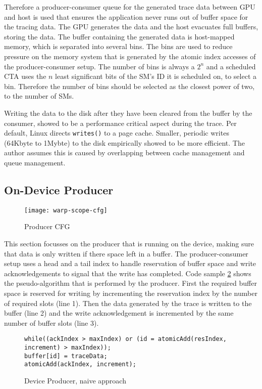	Therefore a producer-consumer queue for the generated trace data between GPU and host is used that ensures the application never runs out of buffer space for the tracing data. The GPU generates the data and the host evacuates full buffers, storing the data.
	The buffer containing the generated data is host-mapped memory, which is separated into several bins. The bins are used to reduce
	pressure on the memory system that is generated by the atomic index accesses of the producer-consumer setup. The number of bins 
	is always a $2^n$ and a scheduled CTA uses the  $n$ least significant bits of the SM's ID it is scheduled on, to select a bin. Therefore the number of bins should be selected as the closest power of two, to the number of SMs.

	Writing the data to the disk after they have been cleared from the buffer by the consumer, showed to be a performance critical aspect during the trace. Per default, Linux directs \verb|writes()| to a page cache. Smaller, periodic writes (64Kbyte to 1Mybte) to the disk empirically showed to be more efficient. The author assumes this is caused by overlapping between cache management and queue management.
	
	\subsection{On-Device Producer}
\begin{figure}[t]
	\centering
	\texttt{[image: warp-scope-cfg]}
	\caption{Producer CFG}
\label{wscfg}
\end{figure}	
	This section focusses on the producer that is running on the device, making sure that data is only written if there space left
	in a buffer. The producer-consumer setup uses a head and a tail index to handle reservation of buffer space and write acknowledgements to signal that the write has completed. Code sample \ref{prod-cons} shows the pseudo-algorithm that is performed by the producer. First the required buffer space is reserved for writing by incrementing the reservation index
	by the number of required slots (line 1). Then the data generated by the trace is
	written to the buffer (line 2) and the write acknowledgement is incremented by the same number of buffer slots (line 3).
\begin{figure}
	\begin{lstlisting}[style=C]
while((ackIndex > maxIndex) or (id = atomicAdd(resIndex, increment) > maxIndex));
buffer[id] = traceData;
atomicAdd(ackIndex, increment);
\end{lstlisting}
	\caption{Device Producer, naive approach}
	\label{prod-cons}
\end{figure}

